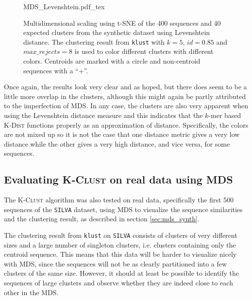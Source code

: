 \begin{figure}[h!]
  \centering
  \def\svgwidth{\columnwidth}
  {MDS_Levenshtein.pdf_tex}
  \caption{Multidimensional scaling using t-SNE of the 400 sequences and 40
    expected clusters from the synthetic dataset using Levenshtein distance.
    The clustering result from \texttt{klust} with $k=5$, $id=0.85$ and
    $max\_rejects=8$ is used to color different clusters with different
    colors. Centroids are marked with a circle and non-centroid sequences
    with a ``+''.}
  \label{fig:mds_synth_lev}
\end{figure}

Once again, the results look very clear and as hoped, but there does seem to be
a little more overlap in the clusters, although this might again be partly
attributed to the imperfection of MDS. In any case, the clusters are also very
apparent when using the Levenshtein distance measure and this indicates that
the $k$-mer based \textsc{K-Dist} functions properly as an approximation of
distance. Specifically, the colors are not mixed up so it is not the case that
one distance metric gives a very low distance while the other gives a very
high distance, and vice versa, for some sequences.


\subsection{Evaluating \textsc{K-Clust} on real data using MDS}
\label{sec:mds_real_data}

The \textsc{K-Clust} algorithm was also tested on real data, specifically the
first 500 sequences of the \texttt{SILVA} dataset, using MDS to visualize the
sequence similarities and the clustering result, as described in section
\ref{sec:mds_synth}.


The clustering result from \texttt{klust} on \texttt{SILVA} consists of
clusters of very different sizes and a large number of singleton clusters, i.e.
clusters containing only the centroid sequence. This means that this data will
be harder to visualize nicely with MDS, since the sequences will not be as
clearly partitioned into a few clusters of the same size. However, it should at
least be possible to identify the sequences of large clusters and observe
whether they are indeed close to each other in the MDS.

